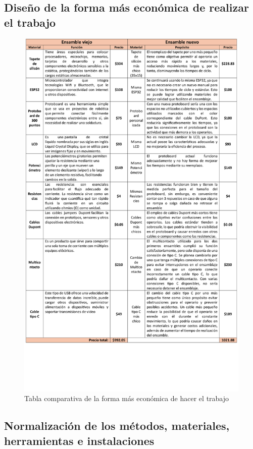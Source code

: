     \subsection{Diseño de la forma más económica de realizar el trabajo}
    \begin{figure}[H]
        \centering
        \includegraphics[trim = {1mm 1mm 1mm 1mm},clip,scale=0.4]{34/img/tablaFormaMásEconómica.pdf}
        \caption{Tabla comparativa de la forma más económica de hacer el trabajo}
        \label{fig:tablaFormaMásEconómica}
    \end{figure}
    \subsection{Normalización de los métodos, materiales, herramientas e instalaciones}
